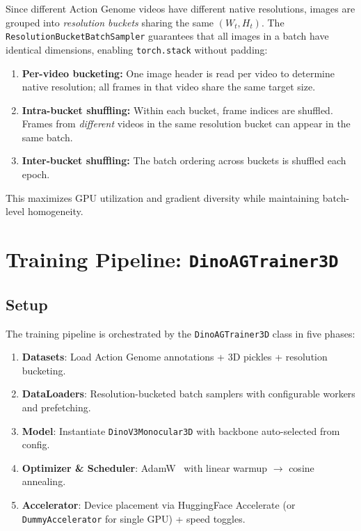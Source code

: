 \documentclass[runningheads]{llncs}
\begin{document}
Since different Action Genome videos have different native resolutions, images are grouped into \emph{resolution buckets} sharing the same $(W_t, H_t)$.  The \texttt{ResolutionBucketBatchSampler} guarantees that all images in a batch have identical dimensions, enabling \texttt{torch.stack} without padding:
\begin{enumerate}
    \item \textbf{Per-video bucketing:} One image header is read per video to determine native resolution; all frames in that video share the same target size.
    \item \textbf{Intra-bucket shuffling:} Within each bucket, frame indices are shuffled.  Frames from \emph{different} videos in the same resolution bucket can appear in the same batch.
    \item \textbf{Inter-bucket shuffling:} The batch ordering across buckets is shuffled each epoch.
\end{enumerate}
This maximizes GPU utilization and gradient diversity while maintaining batch-level homogeneity.


\section{Training Pipeline: \texttt{DinoAGTrainer3D}}
\label{sec:trainer}

\subsection{Setup}
\label{sec:setup}

The training pipeline is orchestrated by the \texttt{DinoAGTrainer3D} class in five phases:
\begin{enumerate}
    \item \textbf{Datasets}: Load Action Genome annotations + 3D pickles + resolution bucketing.
    \item \textbf{DataLoaders}: Resolution-bucketed batch samplers with configurable workers and prefetching.
    \item \textbf{Model}: Instantiate \texttt{DinoV3Monocular3D} with backbone auto-selected from config.
    \item \textbf{Optimizer \& Scheduler}: AdamW~\cite{loshchilov2019decoupled} with linear warmup $\to$ cosine annealing.
    \item \textbf{Accelerator}: Device placement via HuggingFace Accelerate (or \texttt{DummyAccelerator} for single GPU) + speed toggles.
\end{enumerate}
\end{document}
